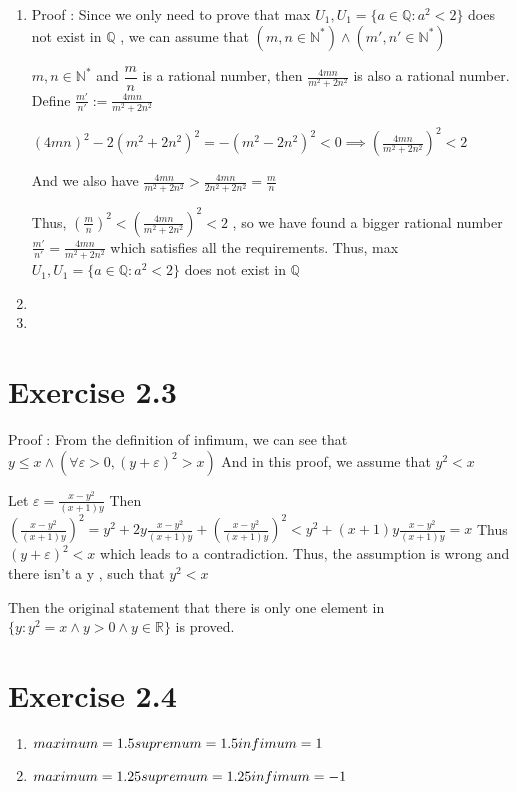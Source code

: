 \documentclass{article}
\begin{document}
\begin{enumerate}
    \item Proof : Since we only need to prove that max $U_1,U_1=\{a\in \mathbb{Q} \colon a^2<2 \}$ does not exist in $\mathbb{Q}$ , we can assume that $ (m,n\in \mathbb{N}^* )\wedge  (m',n'\in \mathbb{N}^* )	$
    
    $m,n\in \mathbb{N}^*$ and $\dfrac{m}{n}$ is a rational number, then $\frac{4 m n}{m^2+2 n^2}$ is also a rational number. Define $\frac{m'}{n'} := \frac{4 m n}{m^2+2 n^2}$
    
    $ (4mn)^2-2(m^2+2n^2)^2=-(m^2-2n^2)^2<0 \implies
   ( \frac{4 m n}{m^2+2 n^2})^2<2		$ 
   
   And we also have 
      $	\frac{4 m n}{m^2+2 n^2}> \frac{4mn}{2n^2+2n^2}=\frac{m}{n}	$
   
   Thus, $ (\frac{m}{n})^2 < (\frac{4 m n}{m^2+2 n^2})^2 < 2 $ , so we have found a bigger rational number $\frac{m'}{n'} = \frac{4 m n}{m^2+2 n^2}$ which satisfies all the requirements. Thus, max $U_1,U_1=\{a\in \mathbb{Q} \colon a^2<2 \}$ does not exist in $\mathbb{Q}$
   
   \item
   
   
   \item
      							

\end{enumerate}


\section{Exercise 2.3}
Proof : 
From the definition of infimum, we can see that $	y\leq x \wedge (\forall \varepsilon >0 ,(y+\varepsilon)^2 >x)	$ And in this proof, we assume that $y^2< x$

Let $\varepsilon=\frac{x-y^2}{(x+1)y}$ Then $(\frac{x-y^2}{(x+1)y})^2=y^2+2y\frac{x-y^2}{(x+1)y}+(\frac{x-y^2}{(x+1)y})^2< y^2 +(x+1)y\frac{x-y^2}{(x+1)y}=x$ Thus $(y+\varepsilon)^2<x$ which leads to a contradiction. Thus, the assumption is wrong and there isn't a y , such that $y^2< x$ 

Then the original statement that there is only one element in  $\{y:y^2= x \wedge y>0 \wedge y \in \mathbb{R}\}$ is proved.



\section{Exercise 2.4}



\begin{enumerate}
	\item $maximum=1.5 \\ supremum=1.5 \\infimum=1$
	\item $maximum=1.25 \\ supremum=1.25 \\infimum=-1	$
\end{enumerate}
\end{document}
